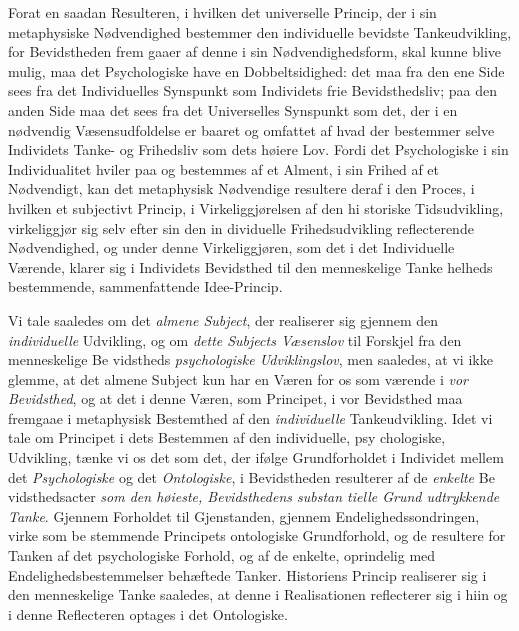 Forat en saadan Resulteren, i hvilken det universelle
Princip, der i sin metaphysiske Nødvendighed bestemmer den
individuelle bevidste Tankeudvikling, for Bevidstheden frem\-%
gaaer af denne i sin Nødvendighedsform, skal kunne blive
mulig, maa det Psychologiske have en Dobbeltsidighed: det
maa fra den ene Side sees fra det Individuelles Synspunkt
som Individets frie Bevidsthedsliv; paa den anden Side maa
det sees fra det Universelles Synspunkt som det, der i en
 nødvendig Væsensudfoldelse er baaret og omfattet af hvad der
bestemmer selve Individets Tanke- og Frihedsliv som dets
høiere Lov. Fordi det Psychologiske i sin Individualitet hviler
paa og bestemmes af et Alment, i sin Frihed af et Nødvendigt,
kan det metaphysisk Nødvendige resultere deraf i den Proces,
i hvilken et subjectivt Princip, i Virkeliggjørelsen af den hi\-%
storiske Tidsudvikling, virkeliggjør sig selv efter sin den in\-%
dividuelle Frihedsudvikling reflecterende Nødvendighed, og under
denne Virkeliggjøren, som det i det Individuelle Værende,
klarer sig i Individets Bevidsthed til den menneskelige Tanke\-%
helheds bestemmende, sammenfattende Idee-Princip.

Vi tale saaledes om det \emph{almene Subject}, der realiserer
sig gjennem den \emph{individuelle} Udvikling, og om \emph{dette
Subjects Væsenslov} til Forskjel fra den menneskelige Be\-%
vidstheds \emph{psychologiske Udviklingslov}, men saaledes, at
vi ikke glemme, at det almene Subject kun har en Væren for
os som værende i \emph{vor Bevidsthed}, og at det i denne Væren,
som Principet, i vor Bevidsthed maa fremgaae i metaphysisk
Bestemthed af den \emph{individuelle} Tankeudvikling. Idet vi
tale om Principet i dets Bestemmen af den individuelle, psy\-%
chologiske, Udvikling, tænke vi os det som det, der ifølge
Grundforholdet i Individet mellem det \emph{Psychologiske} og det
\emph{Ontologiske}, i Bevidstheden resulterer af de \emph{enkelte} Be\-%
vidsthedsacter \emph{som den høieste, Bevidsthedens substan\-%
tielle Grund udtrykkende Tanke}. Gjennem Forholdet
til Gjenstanden, gjennem Endelighedssondringen, virke som be\-%
stemmende Principets ontologiske Grundforhold, og de resultere
for Tanken af det psychologiske Forhold, og af de enkelte,
oprindelig med Endelighedsbestemmelser behæftede Tanker.
Historiens Princip realiserer sig i den menneskelige Tanke
saaledes, at denne i Realisationen reflecterer sig i hiin og i
denne Reflecteren optages i det Ontologiske.

